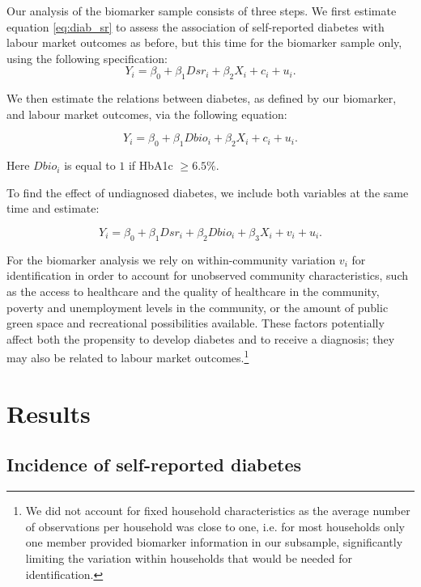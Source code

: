 Our analysis of the biomarker sample consists of three steps. We first estimate equation \ref{eq:diab_sr} to assess the association of self-reported diabetes with labour market outcomes as before, but this time for the biomarker sample only, using the following specification:
\begin{equation}
Y_{i}=\beta_{0}+\beta_{1}Dsr_{i}+\beta_{2}X_{i}+c_{i}+u_{i}.\label{eq:diab_sr}
\end{equation}

We then estimate the relations between diabetes, as defined by our biomarker, and labour market outcomes, via the following equation:

\begin{equation}
Y_{i}=\beta_{0}+\beta_{1}Dbio_{i}+\beta_{2}X_{i}+c_{i}+u_{i}.\label{eq:diab}
\end{equation}

Here $Dbio_{i}$ is equal to $1$ if \ac{HbA1c} $\geq6.5\%$. 

To find the effect of undiagnosed diabetes, we include both variables at the same time and estimate:

\begin{equation}
Y_{i}=\beta_{0}+\beta_{1}Dsr_{i}+\beta_{2}Dbio_{i}+\beta_{3}X_{i}+v_{i}+u_{i}.\label{eq:diab_ud}
\end{equation}

For the biomarker analysis we rely on within-community variation $v_{i}$ for identification in order to account for unobserved community characteristics, such as the access to healthcare and the quality of healthcare in the community, poverty and unemployment levels in the community, or the amount of public green space and recreational possibilities available. These factors potentially affect both the propensity to develop diabetes and to receive a diagnosis; they may also be related to labour market outcomes.\footnote{We did not account for fixed household characteristics as the average number of observations per household was close to one, i.e. for most households only one member provided biomarker information in our subsample, significantly limiting the variation within households that would be needed for identification.}

\section{\label{sec:cha_4_results}Results}


\subsection{Incidence of self-reported diabetes}

